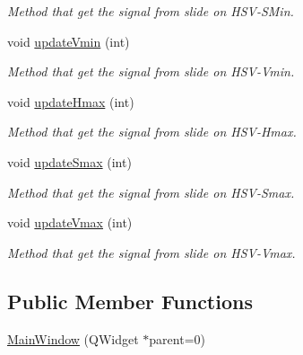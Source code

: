 \begin{DoxyCompactItemize}
\begin{DoxyCompactList}\small\item\em Method that get the signal from slide on H\+S\+V-\/\+S\+Min. \end{DoxyCompactList}\item 
void \hyperlink{classMainWindow_a43da847294670cdaaa17f2235888b47a}{update\+Vmin} (int)\hypertarget{classMainWindow_a43da847294670cdaaa17f2235888b47a}{}\label{classMainWindow_a43da847294670cdaaa17f2235888b47a}

\begin{DoxyCompactList}\small\item\em Method that get the signal from slide on H\+S\+V-\/\+Vmin. \end{DoxyCompactList}\item 
void \hyperlink{classMainWindow_af3d7639f0c28d053fdc10484b109ac99}{update\+Hmax} (int)\hypertarget{classMainWindow_af3d7639f0c28d053fdc10484b109ac99}{}\label{classMainWindow_af3d7639f0c28d053fdc10484b109ac99}

\begin{DoxyCompactList}\small\item\em Method that get the signal from slide on H\+S\+V-\/\+Hmax. \end{DoxyCompactList}\item 
void \hyperlink{classMainWindow_a2c08d2f7c55d78c30b12dd3a16905d7b}{update\+Smax} (int)\hypertarget{classMainWindow_a2c08d2f7c55d78c30b12dd3a16905d7b}{}\label{classMainWindow_a2c08d2f7c55d78c30b12dd3a16905d7b}

\begin{DoxyCompactList}\small\item\em Method that get the signal from slide on H\+S\+V-\/\+Smax. \end{DoxyCompactList}\item 
void \hyperlink{classMainWindow_a2f06abb52f3906ae6177f7fc9f859505}{update\+Vmax} (int)\hypertarget{classMainWindow_a2f06abb52f3906ae6177f7fc9f859505}{}\label{classMainWindow_a2f06abb52f3906ae6177f7fc9f859505}

\begin{DoxyCompactList}\small\item\em Method that get the signal from slide on H\+S\+V-\/\+Vmax. \end{DoxyCompactList}\end{DoxyCompactItemize}
\subsection*{Public Member Functions}
\begin{DoxyCompactItemize}
\item 
\hyperlink{classMainWindow_a8b244be8b7b7db1b08de2a2acb9409db}{Main\+Window} (Q\+Widget $\ast$parent=0)
\end{DoxyCompactItemize}
